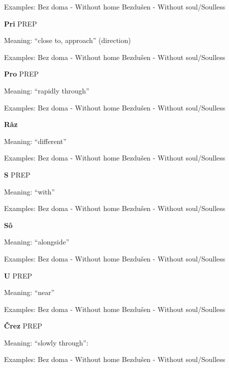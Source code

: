 Examples:
Bez doma - Without home
Bezdušen - Without soul/Soulless 


\textbf{Pri} PREP

Meaning: “close to, approach” (direction)

Examples:
Bez doma - Without home
Bezdušen - Without soul/Soulless 

\textbf{Pro} PREP

Meaning: “rapidly through”

Examples:
Bez doma - Without home
Bezdušen - Without soul/Soulless 

\textbf{Råz}

Meaning: “different”

Examples:
Bez doma - Without home
Bezdušen - Without soul/Soulless 

\textbf{S} PREP

Meaning: “with”

Examples:
Bez doma - Without home
Bezdušen - Without soul/Soulless 

\textbf{Sô}

Meaning: “alongside”

Examples:
Bez doma - Without home
Bezdušen - Without soul/Soulless 

\textbf{U} PREP

Meaning: “near”

Examples:
Bez doma - Without home
Bezdušen - Without soul/Soulless 

\textbf{Črez} PREP

Meaning: “slowly through”:

Examples:
Bez doma - Without home
Bezdušen - Without soul/Soulless 

